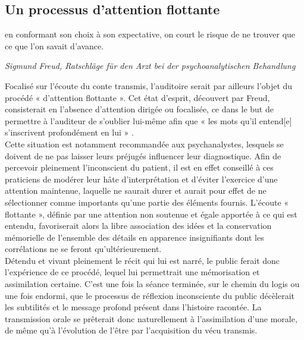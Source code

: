 \clearpage


\subsection{Un processus d'attention flottante}

\begin{shadequote}
[...] en conformant son choix à son expectative, on court le risque de ne trouver que ce que l'on savait d'avance.
\par\emph{Sigmund Freud, Ratschl{\"a}ge f{\"u}r den Arzt bei der psychoanalytischen Behandlung}
\end{shadequote}

Focalisé sur l'écoute du conte transmis, l'auditoire serait par ailleurs l'objet du procédé « d'attention flottante »\cite{freud1996ratschlage}. Cet état d'esprit, découvert par Freud, consisterait en l'absence d'attention dirigée ou focalisée, ce dans le but de permettre à l'auditeur de s'oublier lui-même afin que « les mots qu'il entend[e] s'inscrivent profondément en lui » \cite{benjamin1991gesammelte}.\\

Cette situation est notamment recommandée aux psychanalystes, lesquels se doivent de ne pas laisser leurs préjugés influencer leur diagnostique. Afin de percevoir pleinement l'inconscient du patient, il est en effet conseillé à ces praticiens de modérer leur hâte d'interprétation et d'éviter l'exercice d'une attention maintenue, laquelle ne saurait durer et aurait pour effet de ne sélectionner comme importants qu'une partie des éléments fournis. L'écoute « flottante », définie par une attention non soutenue et égale apportée à ce qui est entendu, favoriserait alors la libre association des idées et la conservation mémorielle de l'ensemble des détails en apparence insignifiants dont les corrélations ne se feront qu'ultérieurement.\\

Détendu et vivant pleinement le récit qui lui est narré, le public ferait donc l'expérience de ce procédé, lequel lui permettrait une mémorisation et assimilation certaine. C'est une fois la séance terminée, sur le chemin du logis ou une fois endormi, que le processus de réflexion inconsciente du public décèlerait les subtilités et le message profond présent dans l'histoire racontée. La transmission orale se prêterait donc naturellement à l'assimilation d'une morale, de même qu'à l'évolution de l'être par l'acquisition du vécu transmis.


